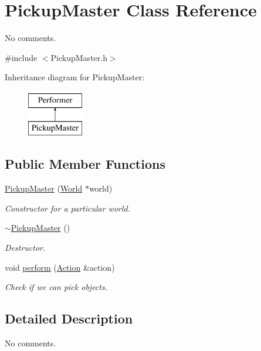 \hypertarget{classPickupMaster}{\section{Pickup\-Master Class Reference}
\label{classPickupMaster}
}


No comments.  




{\ttfamily \#include $<$Pickup\-Master.\-h$>$}

Inheritance diagram for Pickup\-Master\-:\begin{figure}[H]
\begin{center}
\leavevmode
\includegraphics[height=2.000000cm]{classPickupMaster}
\end{center}
\end{figure}
\subsection*{Public Member Functions}
\begin{DoxyCompactItemize}
\item 
\hyperlink{classPickupMaster_aed62158faa3a9b869ac6f0571045fb80}{Pickup\-Master} (\hyperlink{classWorld}{World} $\ast$world)
\begin{DoxyCompactList}\small\item\em Constructor for a particular world. \end{DoxyCompactList}\item 
\hyperlink{classPickupMaster_a0202c688f4dd0a4680729420c5655092}{$\sim$\-Pickup\-Master} ()
\begin{DoxyCompactList}\small\item\em Destructor. \end{DoxyCompactList}\item 
void \hyperlink{classPickupMaster_ac4ad84aace812146c5fa265b0c29c5c1}{perform} (\hyperlink{classAction}{Action} \&action)
\begin{DoxyCompactList}\small\item\em Check if we can pick objects. \end{DoxyCompactList}\end{DoxyCompactItemize}


\subsection{Detailed Description}
No comments. 

